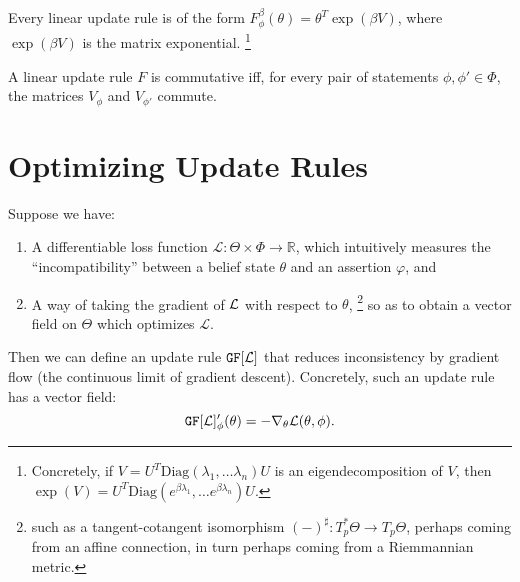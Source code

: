 \documentclass{article}
\begin{document}

\begin{prop}
	Every linear update rule is of the form
	$
		F^{\beta}_\phi(\theta) =  \theta^{T} \exp(\beta V)
	$,
	where $\exp(\beta V)$ is the matrix exponential.%
		\footnote{Concretely, if $V = U^T \mathrm{Diag}(\lambda_1, \ldots \lambda_n) U$ is an eigendecomposition of $V$, then $\exp(V) = U^T \mathrm{Diag}(e^{\beta\lambda_1}, \ldots e^{\beta\lambda_n}) U$.}
\end{prop}

\begin{prop}
	A linear update rule $F$ is commutative iff, for every pair of statements  $\phi, \phi' \in \Phi$, the
	matrices $V_\phi$ and $V_{\phi'}$ commute.
\end{prop}




\section{Optimizing Update Rules}
Suppose we have:
\begin{enumerate}[nosep]
	\item A differentiable loss function $\mathcal L : \Theta \times \Phi  \to \mathbb R$, which intuitively measures the ``incompatibility'' between a belief state $\theta$ and an assertion $\varphi$, and
	\item
		A way of taking the gradient of ${\cal L}$ with respect to $\theta$,%
			\footnote{
			such as a tangent-cotangent isomorphism $(-)^\sharp : T^*_p\Theta \to T_p \Theta$, perhaps coming from an affine connection, in turn perhaps coming from a Riemmannian metric.}
        so as to obtain a vector field on $\Theta$ which optimizes $\mathcal L.$
\end{enumerate}
\def\GD#1{\mathtt{GF}[#1]}
\def\NGD#1{\mathtt{NGF}[#1]}

Then we can define an update rule $\GD {\cal L}$ that reduces inconsistency by gradient flow (the continuous limit of gradient descent). Concretely, such an update rule has a vector field:
\[
	\GD {\cal L}'_\phi(\theta) = - \nabla_\theta {\cal L}(\theta,\phi).
\]
\end{document}
